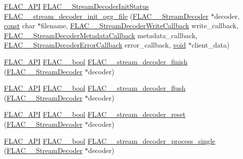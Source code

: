 \begin{DoxyCompactItemize}
\hyperlink{group__flac__export_ga56ca07df8a23310707732b1c0007d6f5}{F\+L\+A\+C\+\_\+\+A\+PI} \hyperlink{group__flac__stream__decoder_gaaed54a24ac6310d29c5cafba79759c44}{F\+L\+A\+C\+\_\+\+\_\+\+Stream\+Decoder\+Init\+Status} \hyperlink{group__flac__stream__decoder_ga609f2a43987d6abeaef654575462030c}{F\+L\+A\+C\+\_\+\+\_\+stream\+\_\+decoder\+\_\+init\+\_\+ogg\+\_\+file} (\hyperlink{struct_f_l_a_c_____stream_decoder}{F\+L\+A\+C\+\_\+\+\_\+\+Stream\+Decoder} $\ast$decoder, \hyperlink{zconf_8h_a2c212835823e3c54a8ab6d95c652660e}{const} char $\ast$filename, \hyperlink{group__flac__stream__decoder_ga61e48dc2c0d2f6c5519290ff046874a4}{F\+L\+A\+C\+\_\+\+\_\+\+Stream\+Decoder\+Write\+Callback} write\+\_\+callback, \hyperlink{group__flac__stream__decoder_ga6aa87c01744c1c601b7f371f627b6e14}{F\+L\+A\+C\+\_\+\+\_\+\+Stream\+Decoder\+Metadata\+Callback} metadata\+\_\+callback, \hyperlink{group__flac__stream__decoder_gac896ee6a12668e9015fab4fbc6aae996}{F\+L\+A\+C\+\_\+\+\_\+\+Stream\+Decoder\+Error\+Callback} error\+\_\+callback, \hyperlink{png_8h_ac9c84fa68bbad002983e35ce3663c686}{void} $\ast$client\+\_\+data)
\item 
\hyperlink{group__flac__export_ga56ca07df8a23310707732b1c0007d6f5}{F\+L\+A\+C\+\_\+\+A\+PI} \hyperlink{ordinals_8h_a95103469f1cbd78b8cf250194985b34e}{F\+L\+A\+C\+\_\+\+\_\+bool} \hyperlink{group__flac__stream__decoder_gaa51bb38f762ee11b320a0839f165c5ce}{F\+L\+A\+C\+\_\+\+\_\+stream\+\_\+decoder\+\_\+finish} (\hyperlink{struct_f_l_a_c_____stream_decoder}{F\+L\+A\+C\+\_\+\+\_\+\+Stream\+Decoder} $\ast$decoder)
\item 
\hyperlink{group__flac__export_ga56ca07df8a23310707732b1c0007d6f5}{F\+L\+A\+C\+\_\+\+A\+PI} \hyperlink{ordinals_8h_a95103469f1cbd78b8cf250194985b34e}{F\+L\+A\+C\+\_\+\+\_\+bool} \hyperlink{group__flac__stream__decoder_ga0109ce87f2c648b224b68c08b3c090cb}{F\+L\+A\+C\+\_\+\+\_\+stream\+\_\+decoder\+\_\+flush} (\hyperlink{struct_f_l_a_c_____stream_decoder}{F\+L\+A\+C\+\_\+\+\_\+\+Stream\+Decoder} $\ast$decoder)
\item 
\hyperlink{group__flac__export_ga56ca07df8a23310707732b1c0007d6f5}{F\+L\+A\+C\+\_\+\+A\+PI} \hyperlink{ordinals_8h_a95103469f1cbd78b8cf250194985b34e}{F\+L\+A\+C\+\_\+\+\_\+bool} \hyperlink{group__flac__stream__decoder_ga2342cf4f3caf9ad20fca1373aaea0c27}{F\+L\+A\+C\+\_\+\+\_\+stream\+\_\+decoder\+\_\+reset} (\hyperlink{struct_f_l_a_c_____stream_decoder}{F\+L\+A\+C\+\_\+\+\_\+\+Stream\+Decoder} $\ast$decoder)
\item 
\hyperlink{group__flac__export_ga56ca07df8a23310707732b1c0007d6f5}{F\+L\+A\+C\+\_\+\+A\+PI} \hyperlink{ordinals_8h_a95103469f1cbd78b8cf250194985b34e}{F\+L\+A\+C\+\_\+\+\_\+bool} \hyperlink{group__flac__stream__decoder_ga8c4708eb2c5d99595f64dc2473aa2f42}{F\+L\+A\+C\+\_\+\+\_\+stream\+\_\+decoder\+\_\+process\+\_\+single} (\hyperlink{struct_f_l_a_c_____stream_decoder}{F\+L\+A\+C\+\_\+\+\_\+\+Stream\+Decoder} $\ast$decoder)

\end{DoxyCompactItemize}
